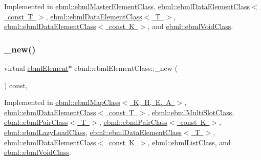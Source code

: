 Implemented in \mbox{\hyperlink{classebml_1_1ebmlMasterElementClass_aeda43063d78233403fa084800ff9c109}{ebml\+::ebml\+Master\+Element\+Class}}, \mbox{\hyperlink{classebml_1_1ebmlDataElementClass_3_01const_01T_01_4_a472912867198ebff97d963cdd7f5ce33}{ebml\+::ebml\+Data\+Element\+Class$<$ const T $>$}}, \mbox{\hyperlink{classebml_1_1ebmlDataElementClass_ac0b070ab767aecb9387f9c0e412e8136}{ebml\+::ebml\+Data\+Element\+Class$<$ T $>$}}, \mbox{\hyperlink{classebml_1_1ebmlDataElementClass_ac0b070ab767aecb9387f9c0e412e8136}{ebml\+::ebml\+Data\+Element\+Class$<$ const K $>$}}, and \mbox{\hyperlink{classebml_1_1ebmlVoidClass_a4b4b65f2289a5f4cbd182dac7b5aa1db}{ebml\+::ebml\+Void\+Class}}.

\mbox{\label{classebml_1_1ebmlElementClass_a223ede6b8bc3c85251d2d73f0256fb45}} 
\subsubsection{\texorpdfstring{\+\_\+new()}{\_new()}}
{\footnotesize\ttfamily virtual \mbox{\hyperlink{classebml_1_1ebmlElement}{ebml\+Element}}$\ast$ ebml\+::ebml\+Element\+Class\+::\+\_\+new (\begin{DoxyParamCaption}{ }\end{DoxyParamCaption}) const\hspace{0.3cm}{\ttfamily [protected]}, {}}



Implemented in \mbox{\hyperlink{classebml_1_1ebmlMapClass_a3370b9b3457982693c08723af7d5130a}{ebml\+::ebml\+Map\+Class$<$ K, H, E, A $>$}}, \mbox{\hyperlink{classebml_1_1ebmlDataElementClass_3_01const_01T_01_4_aaf6b66092e1987919e277661b62f2d90}{ebml\+::ebml\+Data\+Element\+Class$<$ const T $>$}}, \mbox{\hyperlink{classebml_1_1ebmlMultiSlotClass_ab0cb2ed53ef6a3a8e64ffc47c72f5b94}{ebml\+::ebml\+Multi\+Slot\+Class}}, \mbox{\hyperlink{classebml_1_1ebmlPairClass_abb748027028719a4a1682c089ac21226}{ebml\+::ebml\+Pair\+Class$<$ T $>$}}, \mbox{\hyperlink{classebml_1_1ebmlPairClass_abb748027028719a4a1682c089ac21226}{ebml\+::ebml\+Pair\+Class$<$ const K $>$}}, \mbox{\hyperlink{classebml_1_1ebmlLazyLoadClass_a5492f081f425fcbff11095f483b52f32}{ebml\+::ebml\+Lazy\+Load\+Class}}, \mbox{\hyperlink{classebml_1_1ebmlDataElementClass_a79fabffdfd33bee94cd14416646da546}{ebml\+::ebml\+Data\+Element\+Class$<$ T $>$}}, \mbox{\hyperlink{classebml_1_1ebmlDataElementClass_a79fabffdfd33bee94cd14416646da546}{ebml\+::ebml\+Data\+Element\+Class$<$ const K $>$}}, \mbox{\hyperlink{classebml_1_1ebmlListClass_aef729ee70f218de1013c3782c481bffb}{ebml\+::ebml\+List\+Class}}, and \mbox{\hyperlink{classebml_1_1ebmlVoidClass_a3403a8145594a3ce5e34b02dd2f938ae}{ebml\+::ebml\+Void\+Class}}.

